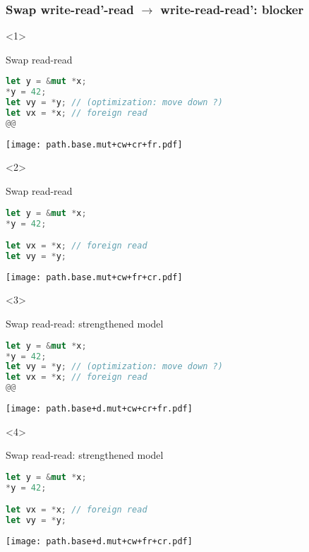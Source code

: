 \begin{frame}[fragile, t]
    \frametitle{Swap write-read'-read \(\to\) write-read-read': blocker}
    \begin{onlyenv}<1>
        \begin{block}{{\cmark} Swap read-read\vphantom{gh}}
            \begin{lstlisting}[language=rust, escapechar=@]
let y = &mut *x;
*y = 42;
let vy = *y; // (optimization: move down ?)
let vx = *x; // foreign read
@@
            \end{lstlisting}
        \end{block}
        \texttt{[image: path.base.mut+cw+cr+fr.pdf]}
    \end{onlyenv}

    \begin{onlyenv}<2>
        \begin{block}{{\cmark} Swap read-read\vphantom{gh}}
            \begin{lstlisting}[language=rust, escapechar=@]
let y = &mut *x;
*y = 42;

let vx = *x; // foreign read
let vy = *y;
            \end{lstlisting}
        \end{block}
        \texttt{[image: path.base.mut+cw+fr+cr.pdf]}
    \end{onlyenv}

    \begin{onlyenv}<3>
        \begin{block}{{\xmark} Swap read-read: strengthened model}
            \begin{lstlisting}[language=rust, escapechar=@]
let y = &mut *x;
*y = 42;
let vy = *y; // (optimization: move down ?)
let vx = *x; // foreign read
@@
            \end{lstlisting}
        \end{block}
        \texttt{[image: path.base+d.mut+cw+cr+fr.pdf]}
    \end{onlyenv}

    \begin{onlyenv}<4>
        \begin{block}{{\xmark} Swap read-read: strengthened model}
            \begin{lstlisting}[language=rust, escapechar=@]
let y = &mut *x;
*y = 42;

let vx = *x; // foreign read
let vy = *y;
            \end{lstlisting}
        \end{block}
        \texttt{[image: path.base+d.mut+cw+fr+cr.pdf]}
    \end{onlyenv}
\end{frame}

